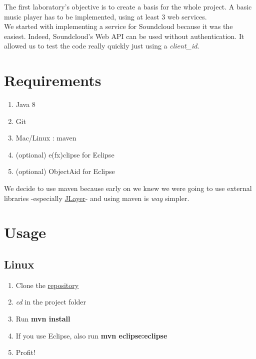 \documentclass{report}
\begin{document}
The first laboratory's objective is to create a basis for the whole project. A basic music player has to be implemented, using at least 3 web services. \\

We started with implementing a service for Soundcloud because it was the easiest. Indeed, Soundcloud's Web API can be used without authentication. It allowed us to test the code really quickly just using a \textit{client\_id}. 


\section{Requirements}

\begin{enumerate}
\item Java 8
\item Git
\item Mac/Linux : maven
\item (optional) e(fx)clipse for Eclipse
\item (optional) ObjectAid for Eclipse
\end{enumerate}

We decide to use maven because early on we knew we were going to use external libraries -especially \href{http://www.javazoom.net/javalayer/javalayer.html}{JLayer}- and using maven is \textit{way} simpler.

\section{Usage}


\subsection{Linux}

\begin{enumerate}
\item Clone the \href{https://github.com/cnamal/arch-LOG8430}{repository}
\item \textit{cd} in the project folder
\item Run \textbf{mvn install}
\item If you use Eclipse, also run \textbf{mvn eclipse:eclipse}
\item Profit!
\end{enumerate}
\end{document}
